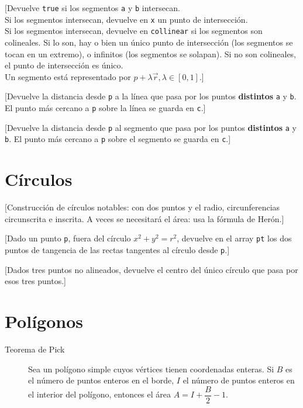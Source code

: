 		[Devuelve \texttt{true} si los segmentos \texttt{a} y \texttt{b} intersecan.\\
		Si los segmentos intersecan, devuelve en \texttt{x} un punto de intersección.\\
		Si los segmentos intersecan, devuelve en \texttt{collinear} si los segmentos son colineales. Si lo son, hay o bien un único punto de intersección (los segmentos se tocan en un extremo), o infinitos (los segmentos se solapan). Si no son colineales, el punto de intersección es único.\\
		Un segmento está representado por $p + \lambda \vec{r}, \lambda \in [0, 1]$.]

		[Devuelve la distancia desde \texttt{p} a la línea que pasa por los puntos \textbf{distintos} \texttt{a} y \texttt{b}. El punto más cercano a \texttt{p} sobre la línea se guarda en \texttt{c}.]
	
		[Devuelve la distancia desde \texttt{p} al segmento que pasa por los puntos \textbf{distintos} \texttt{a} y \texttt{b}. El punto más cercano a \texttt{p} sobre el segmento se guarda en \texttt{c}.]

\section{Círculos}

		[Construcción de círculos notables: con dos puntos y el radio, circunferencias circunscrita e inscrita. A veces se necesitará el área: usa la fórmula de Herón.]
	
		[Dado un punto \texttt{p}, fuera del círculo $x^2 + y^2 = r^2$, devuelve en el array \texttt{pt} los dos puntos de tangencia de las rectas tangentes al círculo desde \texttt{p}.]
		
		[Dados tres puntos no alineados, devuelve el centro del único círculo que pasa por esos tres puntos.] %

\section{Polígonos}
	\begin{description}
		\item[Teorema de Pick] Sea un polígono simple cuyos vértices tienen coordenadas enteras. Si $B$ es el número de puntos enteros en el borde, $I$ el número de puntos enteros en el interior del polígono, entonces el área $A = I + \dfrac{B}{2} - 1$.
	\end{description}

